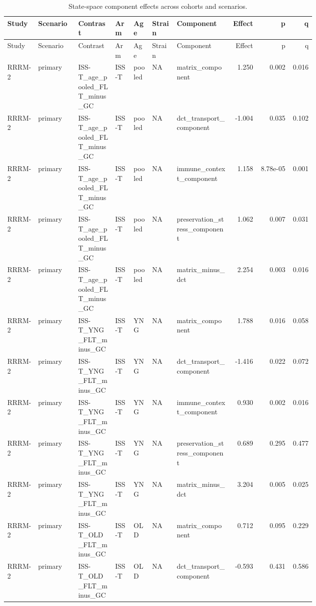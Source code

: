 \documentclass[11pt]{article}
\begin{document}
\begin{landscape}
\scriptsize
\setlength{\tabcolsep}{3pt}
\begin{longtable}{p{0.10\linewidth}p{0.13\linewidth}p{0.12\linewidth}p{0.06\linewidth}p{0.06\linewidth}p{0.08\linewidth}p{0.18\linewidth}rrr}
\caption{State-space component effects across cohorts and scenarios.}\\
\toprule
Study & Scenario & Contrast & Arm & Age & Strain & Component & Effect & p & q \\
\midrule
\endfirsthead
\toprule
Study & Scenario & Contrast & Arm & Age & Strain & Component & Effect & p & q \\
\midrule
\endhead
RRRM-2 & primary & ISS-T\_age\_pooled\_FLT\_minus\_GC & ISS-T & pooled & NA & matrix\_component & 1.250 & 0.002 & 0.016 \\
RRRM-2 & primary & ISS-T\_age\_pooled\_FLT\_minus\_GC & ISS-T & pooled & NA & dct\_transport\_component & -1.004 & 0.035 & 0.102 \\
RRRM-2 & primary & ISS-T\_age\_pooled\_FLT\_minus\_GC & ISS-T & pooled & NA & immune\_context\_component & 1.158 & 8.78e-05 & 0.001 \\
RRRM-2 & primary & ISS-T\_age\_pooled\_FLT\_minus\_GC & ISS-T & pooled & NA & preservation\_stress\_component & 1.062 & 0.007 & 0.031 \\
RRRM-2 & primary & ISS-T\_age\_pooled\_FLT\_minus\_GC & ISS-T & pooled & NA & matrix\_minus\_dct & 2.254 & 0.003 & 0.016 \\
RRRM-2 & primary & ISS-T\_YNG\_FLT\_minus\_GC & ISS-T & YNG & NA & matrix\_component & 1.788 & 0.016 & 0.058 \\
RRRM-2 & primary & ISS-T\_YNG\_FLT\_minus\_GC & ISS-T & YNG & NA & dct\_transport\_component & -1.416 & 0.022 & 0.072 \\
RRRM-2 & primary & ISS-T\_YNG\_FLT\_minus\_GC & ISS-T & YNG & NA & immune\_context\_component & 0.930 & 0.002 & 0.016 \\
RRRM-2 & primary & ISS-T\_YNG\_FLT\_minus\_GC & ISS-T & YNG & NA & preservation\_stress\_component & 0.689 & 0.295 & 0.477 \\
RRRM-2 & primary & ISS-T\_YNG\_FLT\_minus\_GC & ISS-T & YNG & NA & matrix\_minus\_dct & 3.204 & 0.005 & 0.025 \\
RRRM-2 & primary & ISS-T\_OLD\_FLT\_minus\_GC & ISS-T & OLD & NA & matrix\_component & 0.712 & 0.095 & 0.229 \\
RRRM-2 & primary & ISS-T\_OLD\_FLT\_minus\_GC & ISS-T & OLD & NA & dct\_transport\_component & -0.593 & 0.431 & 0.586 \\

\end{longtable}
\end{landscape}
\end{document}
